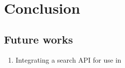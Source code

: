 
\section{Conclusion}
\label{sec:conclusion}


\subsection{Future works}
\begin{enumerate}
    \item Integrating a search API for use in  
    
\end{enumerate}